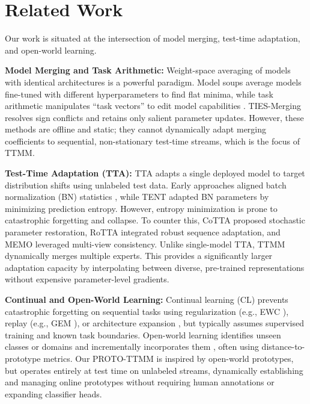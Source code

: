 \documentclass[twoside]{article}
\begin{document}
\section{Related Work}
\label{sec:related_work}

Our work is situated at the intersection of model merging, test-time adaptation, and open-world learning.

\textbf{Model Merging and Task Arithmetic:} Weight-space averaging of models with identical architectures is a powerful paradigm. Model soups \cite{wortsman2022model} average models fine-tuned with different hyperparameters to find flat minima, while task arithmetic manipulates ``task vectors'' to edit model capabilities \cite{rame2022model}. TIES-Merging \cite{tiesmerge2026} resolves sign conflicts and retains only salient parameter updates. However, these methods are offline and static; they cannot dynamically adapt merging coefficients to sequential, non-stationary test-time streams, which is the focus of TTMM.

\textbf{Test-Time Adaptation (TTA):} TTA adapts a single deployed model to target distribution shifts using unlabeled test data. Early approaches aligned batch normalization (BN) statistics \cite{schneider2020improving}, while TENT \cite{wang2020tent} adapted BN parameters by minimizing prediction entropy. However, entropy minimization is prone to catastrophic forgetting and collapse. To counter this, CoTTA \cite{cotta2026} proposed stochastic parameter restoration, RoTTA \cite{rotta2026} integrated robust sequence adaptation, and MEMO \cite{memo2026} leveraged multi-view consistency. Unlike single-model TTA, TTMM dynamically merges multiple experts. This provides a significantly larger adaptation capacity by interpolating between diverse, pre-trained representations without expensive parameter-level gradients.

\textbf{Continual and Open-World Learning:} Continual learning (CL) prevents catastrophic forgetting on sequential tasks using regularization (e.g., EWC \cite{kirkpatrick2017overcoming}), replay (e.g., GEM \cite{lopez2017gradient}), or architecture expansion \cite{delange2021continual}, but typically assumes supervised training and known task boundaries. Open-world learning identifies unseen classes or domains and incrementally incorporates them \cite{bendale2015towards}, often using distance-to-prototype metrics. Our PROTO-TTMM is inspired by open-world prototypes, but operates entirely at test time on unlabeled streams, dynamically establishing and managing online prototypes without requiring human annotations or expanding classifier heads.
\end{document}
